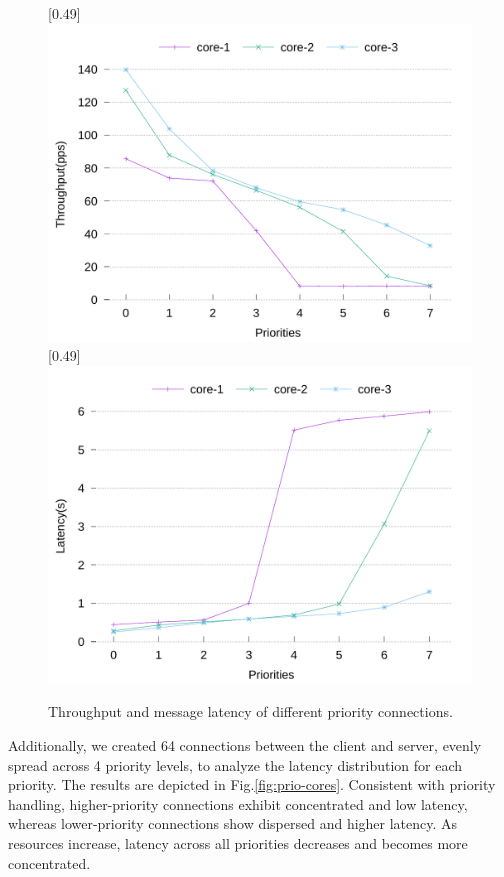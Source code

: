 \documentclass[conference]{IEEEtran}
\begin{document}
\begin{figure}[tbp]
	\centering
	[0.49\linewidth]
	{
		\includegraphics[width=\linewidth]{assets/prio-throughput.pdf}
	}
	[0.49\linewidth]
	{
		\includegraphics[width=\linewidth]{assets/prio-latency.pdf}
	}
	\caption{Throughput and message latency of different priority connections.}
	\label{fig:prio-throughput-latency}
	\vspace{-1.0em}
\end{figure}

Additionally, we created 64 connections between the client and server, evenly spread across 4 priority levels, to analyze the latency distribution for each priority. The results are depicted in Fig.\ref{fig:prio-cores}. Consistent with priority handling, higher-priority connections exhibit concentrated and low latency, whereas lower-priority connections show dispersed and higher latency. As resources increase, latency across all priorities decreases and becomes more concentrated.
\end{document}
